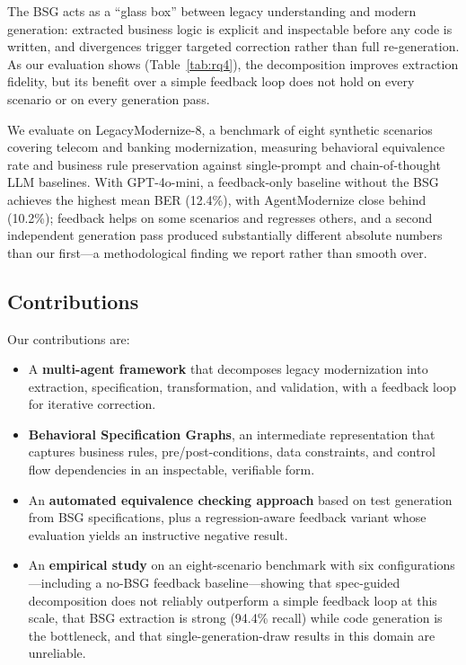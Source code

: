\documentclass[conference]{IEEEtran}
\begin{document}
The BSG acts as a ``glass box'' between legacy understanding and modern generation: extracted business logic is explicit and inspectable before any code is written, and divergences trigger targeted correction rather than full re-generation. As our evaluation shows (Table~\ref{tab:rq4}), the decomposition improves extraction fidelity, but its benefit over a simple feedback loop does not hold on every scenario or on every generation pass.

We evaluate on LegacyModernize-8, a benchmark of eight synthetic scenarios covering telecom and banking modernization, measuring behavioral equivalence rate and business rule preservation against single-prompt and chain-of-thought LLM baselines. With GPT-4o-mini, a feedback-only baseline without the BSG achieves the highest mean BER (12.4\%), with AgentModernize close behind (10.2\%); feedback helps on some scenarios and regresses others, and a second independent generation pass produced substantially different absolute numbers than our first---a methodological finding we report rather than smooth over.

\subsection{Contributions}

Our contributions are:

\begin{itemize}
    \item A \textbf{multi-agent framework} that decomposes legacy modernization into extraction, specification, transformation, and validation, with a feedback loop for iterative correction.
    \item \textbf{Behavioral Specification Graphs}, an intermediate representation that captures business rules, pre/post-conditions, data constraints, and control flow dependencies in an inspectable, verifiable form.
    \item An \textbf{automated equivalence checking approach} based on test generation from BSG specifications, plus a regression-aware feedback variant whose evaluation yields an instructive negative result.
    \item An \textbf{empirical study} on an eight-scenario benchmark with six configurations---including a no-BSG feedback baseline---showing that spec-guided decomposition does not reliably outperform a simple feedback loop at this scale, that BSG extraction is strong (94.4\% recall) while code generation is the bottleneck, and that single-generation-draw results in this domain are unreliable.
\end{itemize}
\end{document}
